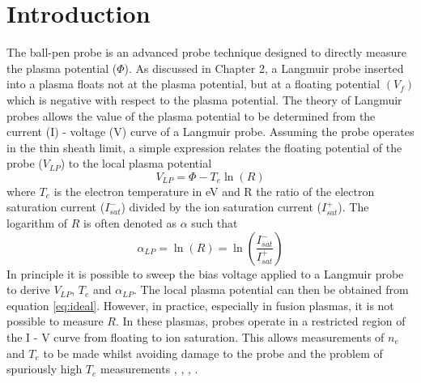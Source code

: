\section{Introduction}
The ball-pen probe is an advanced probe technique designed to directly measure the plasma potential ($\Phi$). As discussed in Chapter 2, a Langmuir probe inserted into a plasma floats not at the plasma potential, but at a floating potential $(V_f)$ which is negative with respect to the plasma potential.  
The theory of Langmuir probes allows the value of the plasma potential to be determined from the current (I) - voltage (V) curve of a Langmuir probe. Assuming the probe operates in the thin sheath limit, a simple expression \cite{bound2} relates the floating potential of the probe ($V_{LP}$) to the local plasma potential
\begin{equation}
V_{LP} = \Phi - T_e\ln(R)
\label{eq:ideal}
\end{equation}
where $T_e$ is the electron temperature in eV and R the ratio of the electron saturation current ($I^-_{sat}$) divided by the ion saturation current ($I^+_{sat}$). The logarithm of $R$ is often denoted as $\alpha$ such that 
\begin{equation}
\alpha_{LP} = \ln(R) = \ln\left(\frac{I^-_{sat}}{I^+_{sat}}\right)
\end{equation}
In principle it is possible to sweep the bias voltage applied to a Langmuir probe to derive $V_{LP}$, $T_e$ and $\alpha_{LP}$. The local plasma potential can then be obtained from equation \ref{eq:ideal}. However, in practice, especially in fusion plasmas,  it is not possible to measure $R$. In these plasmas, probes operate in a restricted region of the I - V curve from floating to ion saturation. This allows measurements of $n_e$ and $T_e$ to be made whilst avoiding damage to the probe and the problem of spuriously high $T_e$ measurements  \cite{JET_TE}, \cite{matthews}, \cite{iv_safe_region}, \cite{pin-plate-pitts}.

